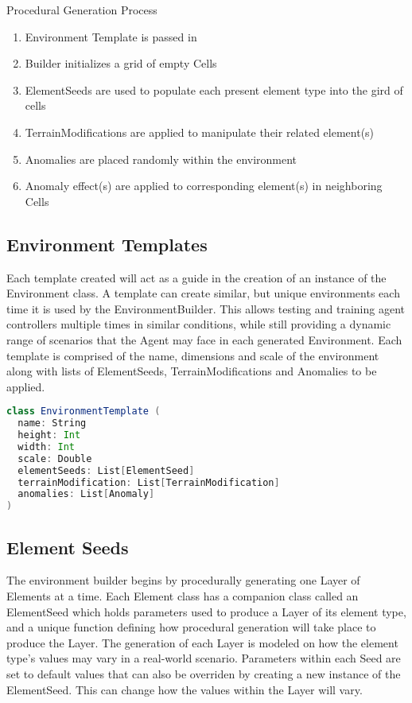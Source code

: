 Procedural Generation Process
\begin{enumerate}
  \item Environment Template is passed in
  \item	Builder initializes a grid of empty Cells
  \item	ElementSeeds are used to populate each present element type into the gird of cells
  \item	TerrainModifications are applied to manipulate their related element(s)
  \item	Anomalies are placed randomly within the environment
  \item	Anomaly effect(s) are applied to corresponding element(s) in neighboring Cells
\end{enumerate}


\subsection{Environment Templates}
Each template created will act as a guide in the creation of an instance of the Environment class.
A template can create similar, but unique environments each time it is used by the EnvironmentBuilder.
This allows testing and training agent controllers multiple times in similar conditions, while still providing a dynamic range of scenarios that the Agent may face in each generated Environment.
Each template is comprised of the name, dimensions and scale of the environment along with lists of ElementSeeds, TerrainModifications and Anomalies to be applied.

\begin{lstlisting}[language=Scala]
class EnvironmentTemplate (
  name: String
  height: Int
  width: Int
  scale: Double
  elementSeeds: List[ElementSeed]
  terrainModification: List[TerrainModification]
  anomalies: List[Anomaly]
)
\end{lstlisting}


\subsection{Element Seeds}
The environment builder begins by procedurally generating one Layer of Elements at a time.
Each Element class has a companion class called an ElementSeed which holds parameters used to produce a Layer of its element type, and a unique function defining how procedural generation will take place to produce the Layer.
The generation of each Layer is modeled on how the element type's values may vary in a real-world scenario.
Parameters within each Seed are set to default values that can also be overriden by creating a new instance of the ElementSeed.
This can change how the values within the Layer will vary.

